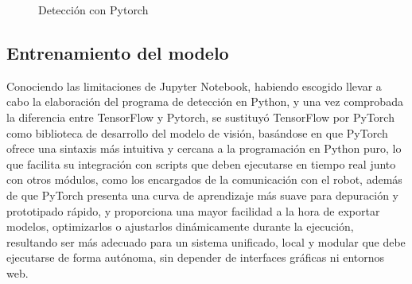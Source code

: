   \begin{figure}[H]
    \begin{center}
      \subcapcentertrue
      \hspace{2mm}
    \end{center}
    \caption{Detección con Pytorch}
    \label{fig:Deteccion_Pytorch}
  \end{figure}
  
\subsection{Entrenamiento del modelo}
\label{sec:entrenamiento_modelo_Pytorch_Python}

Conociendo las limitaciones de Jupyter Notebook, habiendo escogido llevar a cabo la elaboración del programa de detección en Python, y una vez comprobada la diferencia entre TensorFlow y Pytorch, se sustituyó TensorFlow por PyTorch como biblioteca de desarrollo del modelo de visión, basándose en que PyTorch ofrece una sintaxis más intuitiva y cercana a la programación en Python puro, lo que facilita su integración con scripts que deben ejecutarse en tiempo real junto con otros módulos, como los encargados de la comunicación con el robot, además de que PyTorch presenta una curva de aprendizaje más suave para depuración y prototipado rápido, y proporciona una mayor facilidad a la hora de exportar modelos, optimizarlos o ajustarlos dinámicamente durante la ejecución, resultando ser más adecuado para un sistema unificado, local y modular que debe ejecutarse de forma autónoma, sin depender de interfaces gráficas ni entornos web.

